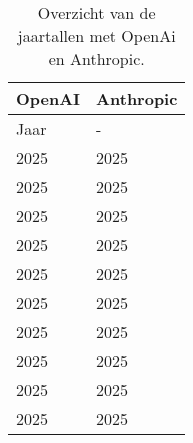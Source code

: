 \begin{table}[h!]
    \caption{Overzicht van de jaartallen met OpenAi en Anthropic.}
    \centering
    \begin{tabularx}{\textwidth}{|X|X|} 
        \hline
        \rowcolor{lightgray}
        OpenAI & Anthropic \\ 
        \hline
        \rowcolor{lightgray}
        Jaar & - \\ 
        \hline
        2025 & 2025 \\ 
        2025 & 2025 \\
        2025 & 2025 \\
        2025 & 2025 \\
        2025 & 2025 \\
        2025 & 2025 \\
        2025 & 2025 \\
        2025 & 2025 \\
        2025 & 2025 \\
        2025 & 2025 \\
        \hline
    \end{tabularx}
    \label{table:llmJaar}
\end{table}
